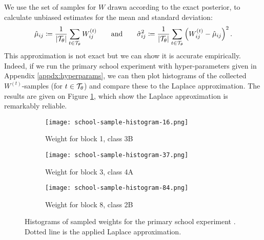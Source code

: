 %
We use the set of samples for $W$ drawn according to the exact posterior, to calculate unbiased estimates for the mean and standard deviation:
%
\begin{equation}
	\hat{\mu}_{ij} \coloneqq \frac{1}{|\mathcal{T}_\theta|} \sum_{t \in \mathcal{T}_\theta} W_{ij}^{(t)} \qquad \textrm{and} \qquad
	\hat{\sigma}_{ij}^2 \coloneqq \frac{1}{|\mathcal{T}_\theta|} \sum_{t \in \mathcal{T}_\theta} \left( W_{ij}^{(t)} - \hat{\mu}_{ij} \right)^2.
\end{equation}
%
This approximation is not exact but we can show it is accurate empirically. Indeed, if we run the primary school experiment with hyper-parameters given in Appendix \ref{appdx:hyperparams}, we can then plot histograms of the collected $W^{(t)}$-samples (for $t \in \mathcal{T}_\theta$) and compare these to the Laplace approximation. The results are given on Figure \ref{fig:school-histogram}, which show the Laplace approximation is remarkably reliable. 

\begin{figure}[!h]
	\centering
	\begin{subfigure}[t]{0.32\linewidth}
		\centering
		\texttt{[image: school-sample-histogram-16.png]}
		\caption{Weight for block 1, class 3B}
	\end{subfigure}
	\hfill
	\begin{subfigure}[t]{0.32\linewidth}
		\centering
		\texttt{[image: school-sample-histogram-37.png]}
		\caption{Weight for block 3, class 4A}
	\end{subfigure}
	\hfill
	\begin{subfigure}[t]{0.32\linewidth}
		\centering
		\texttt{[image: school-sample-histogram-84.png]}
		\caption{Weight for block 8, class 2B}
	\end{subfigure}
	
	\caption{Histograms of sampled weights for the primary school experiment \cite{schools}. Dotted line is the applied Laplace approximation.}
	\label{fig:school-histogram}
\end{figure}

